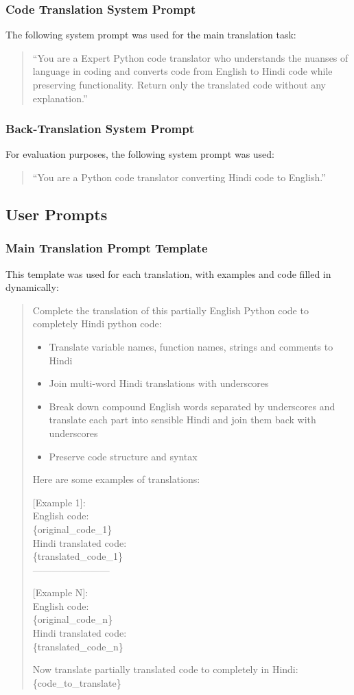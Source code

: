 \documentclass[11pt,a4paper]{article}
\begin{document}
\subsubsection{Code Translation System Prompt}
The following system prompt was used for the main translation task:
\begin{quote}
``You are a Expert Python code translator who understands the nuanses of language in coding and converts code from English to Hindi code while preserving functionality. Return only the translated code without any explanation.''
\end{quote}

\subsubsection{Back-Translation System Prompt}
For evaluation purposes, the following system prompt was used:
\begin{quote}
``You are a Python code translator converting Hindi code to English.''
\end{quote}

\subsection{User Prompts}
\subsubsection{Main Translation Prompt Template}
This template was used for each translation, with examples and code filled in dynamically:
\begin{quote}
Complete the translation of this partially English Python code to completely Hindi python code:
\begin{itemize}
\item Translate variable names, function names, strings and comments to Hindi
\item Join multi-word Hindi translations with underscores
\item Break down compound English words separated by underscores and translate each part into sensible Hindi and join them back with underscores
\item Preserve code structure and syntax
\end{itemize}

Here are some examples of translations:

[Example 1]:\\
English code:\\
\{original\_code\_1\}\\
Hindi translated code:\\
\{translated\_code\_1\}\\
------------------------

[Example N]:\\
English code:\\
\{original\_code\_n\}\\
Hindi translated code:\\
\{translated\_code\_n\}

Now translate partially translated code to completely in Hindi:\\
\{code\_to\_translate\}
\end{quote}
\end{document}
